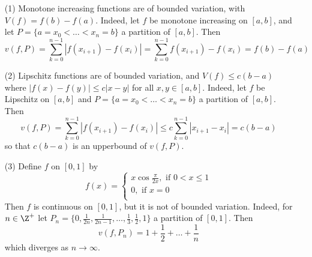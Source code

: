 \begin{example}\label{example_11.1}
    \begin{enumerate}
        \item[(1)] Monotone increasing functions are of bounded variation, with
            $V(f)=f(b)-f(a)$. Indeed, let $f$ be monotone increasing on
            $[a,b]$, and let $P=\{a=x_0<\dots<x_n=b\}$ a partition of $[a,b]$.
            Then
            \begin{equation*}
                v(f,P)=\sum_{k=0}^{n-1}{|f(x_{i+1})-f(x_i)|}=
                \sum_{k=0}^{n-1}{f(x_{i+1})-f(x_i)}=f(b)-f(a)
            \end{equation*}

        \item[(2)] Lipschitz functions are of bounded variation, and $V(f) \leq
            c(b-a)$ where $|f(x)-f(y)| \leq c|x-y|$ for all $x,y \in [a,b]$.
            Indeed, let $f$ be Lipschitz on  $[a,b]$ and
            $P=\{a=x_0<\dots<x_n=b\}$ a partition of $[a,b]$. Then
            \begin{equation*}
                v(f,P)=\sum_{k=0}^{n-1}{|f(x_{i+1})-f(x_i)|} \leq
                c\sum_{k=0}^{n-1}{|x_{i+1}-x_i|}=c(b-a)
            \end{equation*}
            so that $c(b-a)$ is an upperbound of $v(f,P)$.

        \item[(3)] Define $f$ on  $[0,1]$ by
            \begin{equation*}
                f(x)=   \begin{cases}
                            x\cos{\frac{\pi}{2x}}, \text{ if } 0<x \leq 1   \\
                            0, \text{ if } x=0  \\
                        \end{cases}
            \end{equation*}
            Then $f$ is continuous on  $[0,1]$, but it is not of bounded
            variation. Indeed, for $n \in \Z^+$ let $P_n=\{0, \frac{1}{2n},
            \frac{1}{2n-1}, \dots, \frac{1}{3}, \frac{1}{2}, 1\}$ a partition of
            $[0,1]$. Then
            \begin{equation*}
                v(f,P_n)=1+\frac{1}{2}+\dots+\frac{1}{n}
            \end{equation*}
            which diverges as $n \xrightarrow{} \infty$.
    \end{enumerate}
\end{example}

